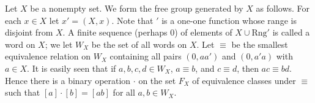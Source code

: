 Let $X$ be a nonempty set. We form the free group generated by $X$ as follows. For each $x \in X$ let $x' = (X, x)$. Note that $'$ is a one-one function whose range is disjoint from $X$. A finite sequence (perhaps $0$) of elements of $X \cup \text{Rng}'$ is called a word on $X$; we let $W_X$ be the set of all words on $X$. Let $\equiv$ be the smallest equivalence relation on $W_X$ containing all pairs $(0, aa')$ and $(0, a'a)$ with $a \in X$. It is easily seen that if $a, b, c, d \in W_X$, $a \equiv b$, and $c \equiv d$, then $ac \equiv bd$. Hence there is a binary operation $\cdot$ on the set $F_X$ of equivalence classes under $\equiv$ such that $[a] \cdot [b] = [ab]$ for all $a, b \in W_X$.